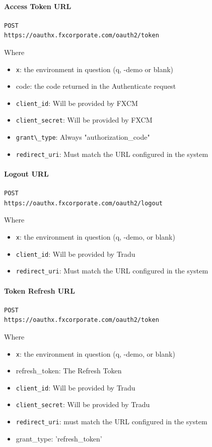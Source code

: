 \documentclass[11pt]{article}
\begin{document}
\paragraph{Access Token URL}

\begin{verbatim}
POST
https://oauthx.fxcorporate.com/oauth2/token
\end{verbatim} 

Where

\begin{itemize}
    \item \verb|x|: the environment in question (q, -demo or blank) 
    \item code: the code returned in the Authenticate request
    \item \verb|client_id|: Will be provided by FXCM
    \item \verb|client_secret|: Will be provided by FXCM
    \item \verb|grant\_type|: Always "authorization\_code"
    \item \verb|redirect_uri|: Must match the URL configured in the system
\end{itemize}

\paragraph{Logout URL}

\begin{verbatim}
POST
https://oauthx.fxcorporate.com/oauth2/logout 
\end{verbatim}

Where

\begin{itemize}
    \item \verb|x|: the environment in question (q, -demo, or blank)
    \item \verb|client_id|: Will be provided by Tradu
    \item \verb|redirect_uri|: Must match the URL configured in the system
\end{itemize}

\paragraph{Token Refresh URL}
\begin{verbatim}
POST
https://oauthx.fxcorporate.com/oauth2/token
\end{verbatim}

Where 

\begin{itemize}
    \item \verb|x|: the environment in question (q, -demo, or blank)
    \item refresh\_token: The Refresh Token
    \item \verb|client_id|: Will be provided by Tradu
    \item \verb|client_secret|: Will be provided by Tradu
    \item \verb|redirect_uri|: must match the URL configured in the system
    \item grant\_type: 'refresh\_token'
\end{itemize}
\end{document}
